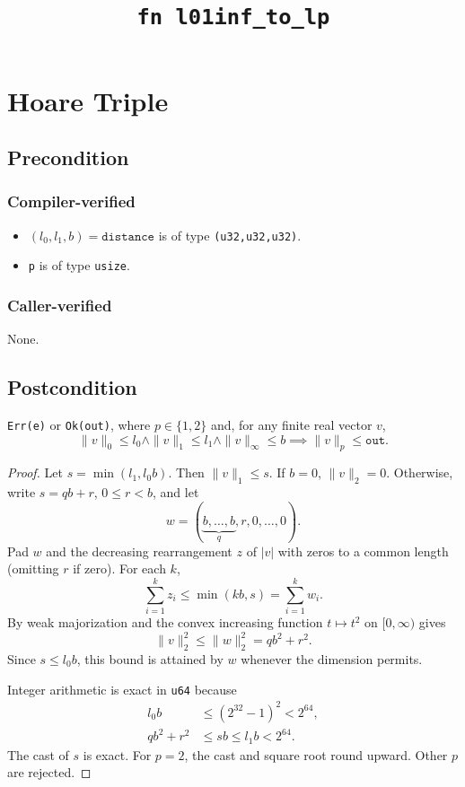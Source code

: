 \documentclass{article}
\title{\texttt{fn l01inf\_to\_lp}}
\author{\MichaelShoemateAuthor}
\begin{document}
\maketitle
\contrib

\section{Hoare Triple}
\subsection*{Precondition}
\subsubsection*{Compiler-verified}
\begin{itemize}
    \item $(l_0,l_1,b)=\texttt{distance}$ is of type \texttt{(u32,u32,u32)}.
    \item \texttt{p} is of type \texttt{usize}.
\end{itemize}

\subsubsection*{Caller-verified}
None.

\subsection*{Postcondition}
\begin{theorem}
    \texttt{Err(e)} or \texttt{Ok(out)}, where $p\in\{1,2\}$ and,
    for any finite real vector $v$,
    \[
        \|v\|_0\le l_0\land\|v\|_1\le l_1\land\|v\|_\infty\le b
        \implies \|v\|_p\le\texttt{out}.
    \]
\end{theorem}

\begin{proof}
    Let $s=\min(l_1,l_0b)$. Then $\|v\|_1\le s$.
    If $b=0$, $\|v\|_2=0$. Otherwise, write
    $s=qb+r$, $0\le r<b$, and let
    \[
        w=(\underbrace{b,\ldots,b}_{q},r,0,\ldots,0).
    \]
    Pad $w$ and the decreasing rearrangement $z$ of $|v|$ with zeros
    to a common length (omitting $r$ if zero).
    For each $k$,
    \[
        \sum_{i=1}^k z_i\le\min(kb,s)=\sum_{i=1}^k w_i.
    \]
    By weak majorization and the convex increasing
    function $t\mapsto t^2$ on $[0,\infty)$ gives
    \[
        \|v\|_2^2\le\|w\|_2^2=qb^2+r^2.
    \]
    Since $s\le l_0b$, this bound is attained by $w$ whenever the
    dimension permits.

    Integer arithmetic is exact in \texttt{u64} because
    \begin{align*}
        l_0b&\le(2^{32}-1)^2<2^{64},\\
        qb^2+r^2&\le sb\le l_1b<2^{64}.
    \end{align*}
    The cast of $s$ is exact. For $p=2$, the cast and square root
    round upward. Other $p$ are rejected.
\end{proof}
\end{document}
